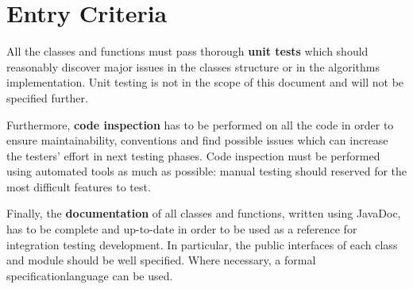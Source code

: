 \section{Entry Criteria}
\label{sec:entry-criteria}

All the classes and functions must pass thorough \textbf{unit tests} which should reasonably discover major issues in the classes structure or in the algorithms implementation. Unit testing is not in the scope of this document and will not be specified further.

Furthermore, \textbf{code inspection} has to be performed on all the code in order to ensure maintainability, conventions and find possible issues which can increase the testers' effort in next testing phases. Code inspection must be performed using automated tools as much as possible: manual testing should reserved for the most difficult features to test.

Finally, the \textbf{documentation} of all classes and functions, written using JavaDoc, has to be complete and up-to-date in order to be used as a reference for integration testing development. In particular, the public interfaces of each class and module should be well specified. Where necessary, a formal specificationlanguage can be used.
